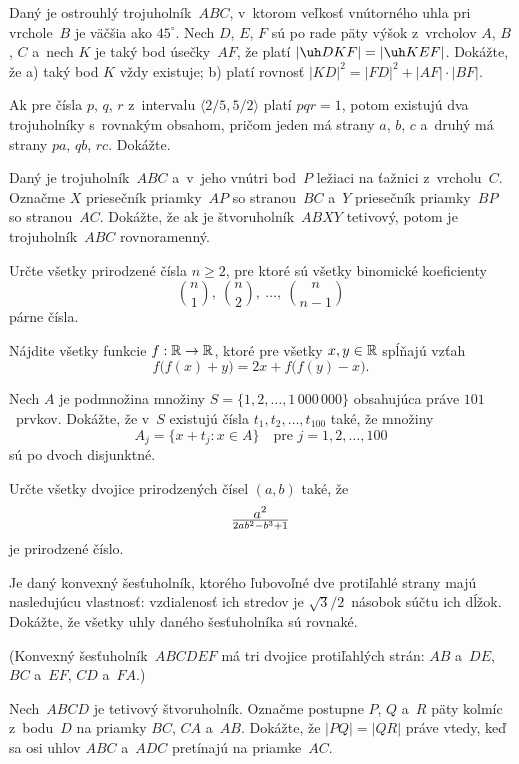 {%
Daný je ostrouhlý trojuholník~$ABC$, v~ktorom veľkosť vnútorného uhla pri vrchole~$B$ je
väčšia ako $45^{\circ}$. Nech $D$, $E$, $F$ sú po rade päty výšok z~vrcholov $A$, $B$, $C$
a~nech $K$ je taký bod úsečky~$AF$, že platí $|\uh DKF|=|\uh KEF|$. Dokážte, že
\ite a) taký bod $K$ vždy existuje;
\ite b) platí rovnosť $|KD|^2=|FD|^2+|AF|\cdot |BF|$.}

{%
Ak pre čísla $p$, $q$, $r$ z~intervalu $\langle 2/5,5/2 \rangle$
platí $pqr=1$, potom existujú dva trojuholníky s~rovnakým obsahom,
pričom jeden má strany $a$, $b$, $c$ a~druhý má strany $pa$, $qb$, $rc$. Dokážte.}

{%
Daný je trojuholník~$ABC$ a~v~jeho vnútri bod~$P$ ležiaci na ťažnici z~vrcholu~$C$. Označme $X$
priesečník priamky~$AP$ so stranou~$BC$ a~$Y$ priesečník priamky~$BP$ so stranou~$AC$. Dokážte,
že ak je štvoruholník~$ABXY$ tetivový, potom je trojuholník~$ABC$ rovnoramenný.}

{%
Určte všetky prirodzené čísla $n\geq 2$, pre ktoré sú všetky binomické koeficienty
$$
{n \choose 1},\ {n \choose 2},\ \dots ,\ {n \choose n-1}
$$
párne čísla.}

{%
Nájdite všetky funkcie $f:\Bbb R \to \Bbb R$, ktoré pre všetky $x,y\in\Bbb R$ spĺňajú vzťah
$$
f\bigl(f(x)+y\bigr)=2x+f\bigl(f(y)-x\bigr).
$$}

{%
Nech $A$ je podmnožina množiny $S=\{1,2,\dots,1\,000\,000\}$
obsahujúca práve $101$~prvkov. Dokážte, že v~$S$ existujú čísla
$t_1,t_2,\dots,t_{100}$ také, že množiny
$$
A_j=\{x+t_j: x\in A\} \quad \text{pre }j=1,2,\dots,100
$$
sú po dvoch disjunktné.}

{%
Určte všetky dvojice prirodzených čísel $(a,b)$ také, že
$$
a^2\over2ab^2-b^3+1
$$
je prirodzené číslo.}

{%
Je daný konvexný šesťuholník, ktorého ľubovoľné dve protiľahlé strany
majú nasledujúcu vlastnosť: vzdialenosť ich stredov je
$\sqrt3/2$~násobok súčtu ich dĺžok. Dokážte, že všetky uhly
daného šesťuholníka sú rovnaké.

(Konvexný šesťuholník~$ABCDEF$ má tri dvojice protiľahlých strán:
$AB$ a~$DE$, $BC$ a~$EF$, $CD$ a~$FA$.)}

{%
Nech~$ABCD$ je tetivový štvoruholník. Označme postupne $P$, $Q$
a~$R$ päty kolmíc z~bodu~$D$ na priamky $BC$, $CA$ a~$AB$.
Dokážte, že $|PQ|=|QR|$ práve vtedy, keď sa osi uhlov $ABC$ a~$ADC$
pretínajú na priamke~$AC$.}

